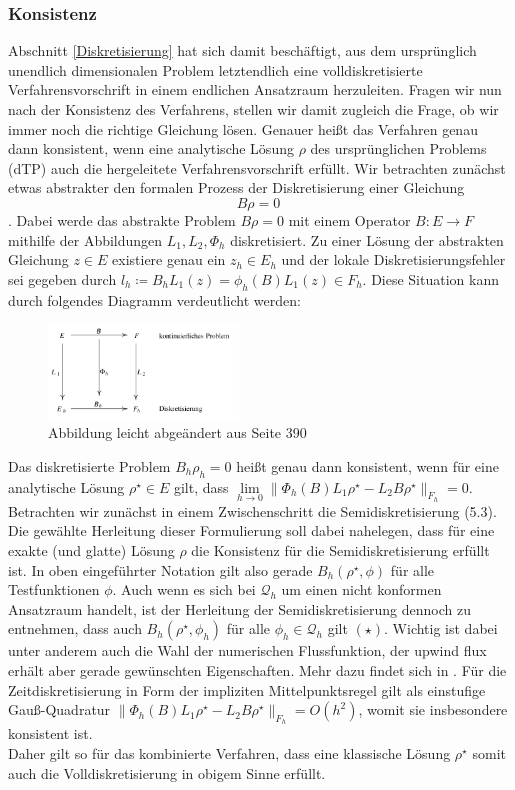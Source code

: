 \subsubsection{Konsistenz}
	 Abschnitt \ref{Diskretisierung} hat sich damit beschäftigt, aus dem ursprünglich unendlich dimensionalen Problem letztendlich eine volldiskretisierte Verfahrensvorschrift in einem endlichen Ansatzraum herzuleiten. Fragen wir nun nach der Konsistenz des Verfahrens, stellen wir damit zugleich die Frage, ob wir immer noch die richtige Gleichung lösen. Genauer heißt das Verfahren genau dann konsistent, wenn eine analytische Lösung $ \rho $ des ursprünglichen Problems (dTP) auch die hergeleitete Verfahrensvorschrift erfüllt. 
	 Wir betrachten zunächst etwas abstrakter den formalen Prozess der Diskretisierung einer Gleichung \[ B \rho=0 \  \].
	 Dabei werde das abstrakte Problem $ B \rho=0 $ mit einem Operator $ B: E \to F $ mithilfe der Abbildungen $ L_1,L_2,\Phi_h $ diskretisiert.
	 Zu einer Lösung der abstrakten Gleichung $ z \in E $ existiere genau ein $ z_h \in E_h$ und der lokale Diskretisierungsfehler sei gegeben durch $
	 l_h \coloneqq B_h L_1(z) = \phi_h(B) L_1(z) \in F_h
	 $. Diese Situation kann durch folgendes Diagramm verdeutlicht werden:
	 \begin{figure}[H]
	 	\centering
	 	\includegraphics[width=0.45\textwidth]{abstraktkonsistenz2.png} \\
	 	Abbildung leicht abgeändert aus \cite{brokate2016grundwissen} Seite 390
	 \end{figure}
	 Das diskretisierte Problem $ B_h \rho_h = 0  $ heißt genau dann konsistent, wenn für eine analytische Lösung $ \rho^{\star} \in E $ gilt, dass $ \lim\limits_{h \to 0}\lVert \Phi_h(B)L_1\rho^{\star} - L_2B\rho^{\star} \rVert_{F_h} = 0 $.
	 Betrachten wir zunächst in einem Zwischenschritt die Semidiskretisierung (5.3).
	 Die gewählte Herleitung dieser Formulierung soll dabei nahelegen, dass für eine exakte (und glatte) Lösung $ \rho $ die Konsistenz für die Semidiskretisierung erfüllt ist. In oben eingeführter Notation gilt also gerade $ B_h(\rho^{\star},\phi) $ für alle Testfunktionen $ \phi $. Auch wenn es sich bei $ \mathcal{Q}_h $ um einen nicht konformen Ansatzraum handelt, ist der Herleitung der Semidiskretisierung dennoch zu entnehmen, dass auch $ B_h(\rho^{\star},\phi_h) $ für alle $ \phi_h \in \mathcal{Q}_h $ gilt $(\star)$.  Wichtig ist dabei unter anderem auch die Wahl der numerischen Flussfunktion, der upwind flux erhält aber gerade gewünschten Eigenschaften. 
	 Mehr dazu findet sich in \cite{Har08b}.
	 Für die Zeitdiskretisierung in Form der impliziten Mittelpunktsregel gilt als einstufige Gauß-Quadratur $ \lVert \Phi_h(B)L_1\rho^{\star} - L_2B\rho^{\star} \rVert_{F_h} = O(h^2)$, womit sie insbesondere konsistent ist. \\
	 Daher gilt so für das kombinierte Verfahren, dass eine klassische Lösung $ \rho^{\star} $ somit auch die Volldiskretisierung in obigem Sinne erfüllt. 
